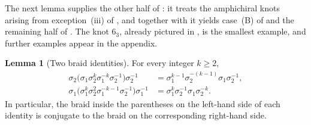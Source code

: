 \documentclass[11pt]{article}
\theoremstyle{definition}
\newtheorem{lemma}[lemma]{Lemma}
\begin{document}
The next lemma supplies the other half of : it treats the amphichiral
knots arising from exception~\textup{(iii)} of , and together with
 it yields case~\textup{(B)} of  and the remaining half
of . The knot $6_3$, already pictured in , is the
smallest example, and further examples appear in the appendix.
\begin{lemma}[Two braid identities]\label{lem:flype-identities}
For every integer $k\ge2$,
\begin{align}
\sigma_2
\bigl(
\sigma_1\sigma_2^k\sigma_1^{-k}\sigma_2^{-1}
\bigr)
\sigma_2^{-1}
&=
\sigma_1^{k-1}\sigma_2^{-(k-1)}\sigma_1\sigma_2^{-1},
\label{eq:flype-identity-one}\\
\sigma_1
\bigl(
\sigma_1^k\sigma_2^2\sigma_1^{-k-1}\sigma_2^{-1}
\bigr)
\sigma_1^{-1}
&=
\sigma_1^k\sigma_2^{-1}\sigma_1\sigma_2^{-k}.
\label{eq:flype-identity-two}
\end{align}
In particular, the braid inside the parentheses on the left-hand side of
each identity is conjugate to the braid on the corresponding right-hand side.
\end{lemma}
\end{document}
